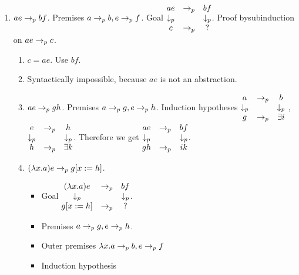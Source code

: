 \documentclass{article}
\begin{document}
\begin{theorem}
\begin{enumerate}
  \item
    $a e \to_{p} b f$.
    Premises $a \to_{p} b, e \to_{p} f$.
    Goal $
    \begin{matrix}
      a e & \to_{p} & b f \\
      \downarrow_p & & \downarrow_p \\
      c & \to_{p} & ?
    \end{matrix}$.
    Proof bysubinduction on $a e \to_{p} c$.
    \begin{enumerate}
    \item
      $c = a e$. Use $b f$.
    \item
      Syntactically impossible, because $a e$ is not an abstraction.
    \item
      $a e \to_{p} g h$.
      Premises $a \to_{p} g, e \to_{p} h$.
      Induction hypotheses $
      \begin{matrix}
        a & \to_{p} & b \\
        \downarrow_p & & \downarrow_p \\
        g & \to_{p} & \exists i
      \end{matrix}$
      ,
      $\begin{matrix}
        e & \to_{p} & h \\
        \downarrow_p & & \downarrow_p \\
        h & \to_{p} & \exists k
      \end{matrix}$.
      Therefore we get $
      \begin{matrix}
        a e & \to_{p} & b f \\
        \downarrow_p & & \downarrow_p \\
        g h & \to_{p} & i k
      \end{matrix}$.
    \item
      $(\lambda x.a) e \to_{p} g[x:=h]$.
      \begin{itemize}
      \item Goal $
        \begin{matrix}
          (\lambda x.a) e & \to_{p} & b f \\
          \downarrow_p & & \downarrow_p \\
          g[x:=h] & \to_{p} & ?
        \end{matrix}$.
      \item Premises $a \to_{p} g, e \to_{p} h$.
      \item Outer premises $\lambda x.a \to_{p} b, e \to_{p} f$
      \item Induction hypothesis

\end{itemize}
\end{enumerate}
\end{enumerate}
\end{theorem}
\end{document}

